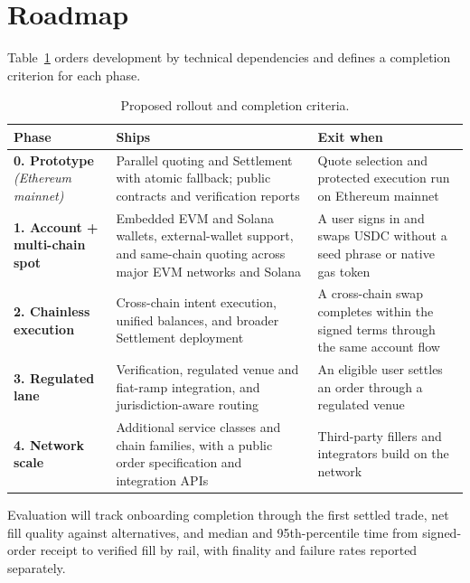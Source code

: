 \section{Roadmap}\label{sec:roadmap}

Table~\ref{tab:roadmap} orders development by technical dependencies and defines a completion criterion for each phase.

\begin{table}[ht]
\centering\small
\caption{Proposed rollout and completion criteria.}
\label{tab:roadmap}
\begin{tabular}{@{}>{\raggedright\arraybackslash}p{}p{}p{}@{}}
\toprule
\textbf{Phase} & \textbf{Ships} & \textbf{Exit when} \\
\midrule
\textbf{0. Prototype} \emph{(Ethereum mainnet)} &
Parallel quoting and Settlement with atomic fallback; public contracts and verification reports &
Quote selection and protected execution run on Ethereum mainnet \\
\addlinespace[0.4em]
\textbf{1. Account + multi-chain spot} &
Embedded EVM and Solana wallets, external-wallet support, and same-chain quoting across major EVM networks and Solana &
A user signs in and swaps USDC without a seed phrase or native gas token \\
\addlinespace[0.4em]
\textbf{2. Chainless execution} &
Cross-chain intent execution, unified balances, and broader Settlement deployment &
A cross-chain swap completes within the signed terms through the same account flow \\
\addlinespace[0.4em]
\textbf{3. Regulated lane} &
Verification, regulated venue and fiat-ramp integration, and jurisdiction-aware routing &
An eligible user settles an order through a regulated venue \\
\addlinespace[0.4em]
\textbf{4. Network scale} &
Additional service classes and chain families, with a public order specification and integration APIs &
Third-party fillers and integrators build on the network \\
\bottomrule
\end{tabular}
\end{table}

Evaluation will track onboarding completion through the first settled trade, net fill quality against alternatives, and median and 95th-percentile time from signed-order receipt to verified fill by rail, with finality and failure rates reported separately.

